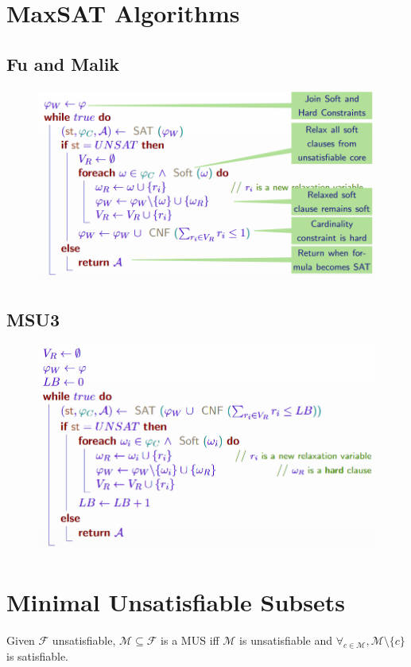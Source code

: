 \documentclass[10pt,a4paper]{report}
\begin{document}
\section{MaxSAT Algorithms}
\subsection{Fu and Malik}
\begin{figure}[H]
    \centering
    \includegraphics[scale=0.5]{10.png}
\end{figure}
\subsection{MSU3}
\begin{figure}[H]
    \centering
    \includegraphics[scale=0.5]{11.png}
\end{figure}

\section{Minimal Unsatisfiable Subsets}
Given $\mathcal{F}$ unsatisfiable, $\mathcal{M} \subseteq \mathcal{F}$ is a MUS iff $\mathcal{M}$ is unsatisfiable and $\forall_{c \in \mathcal{M}}, \mathcal{M} \setminus \{c\}$ is satisfiable.
\end{document}

